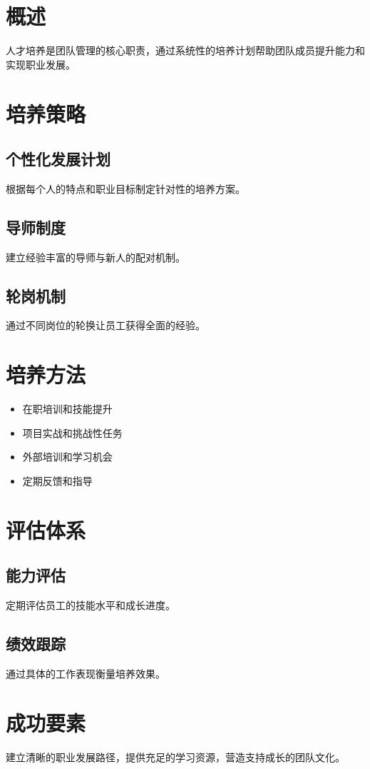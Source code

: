 \section{概述}

人才培养是团队管理的核心职责，通过系统性的培养计划帮助团队成员提升能力和实现职业发展。

\section{培养策略}

\subsection{个性化发展计划}

根据每个人的特点和职业目标制定针对性的培养方案。

\subsection{导师制度}

建立经验丰富的导师与新人的配对机制。

\subsection{轮岗机制}

通过不同岗位的轮换让员工获得全面的经验。

\section{培养方法}

\begin{itemize}
\item 在职培训和技能提升
\item 项目实战和挑战性任务
\item 外部培训和学习机会
\item 定期反馈和指导
\end{itemize}

\section{评估体系}

\subsection{能力评估}

定期评估员工的技能水平和成长进度。

\subsection{绩效跟踪}

通过具体的工作表现衡量培养效果。

\section{成功要素}

建立清晰的职业发展路径，提供充足的学习资源，营造支持成长的团队文化。
